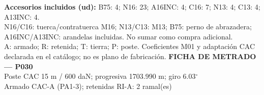 \begingroup\scriptsize
\textbf{Accesorios incluidos (ud):} B75: 4; N16: 23; A16INC: 4; C16: 7; N13: 4; C13: 4; A13INC: 4.\\
N16/C16: tuerca/contratuerca M16; N13/C13: M13; B75: perno de abrazadera; A16INC/A13INC: arandelas incluidas. No sumar como compra adicional.\\
A: armado; R: retenida; T: tierra; P: poste. Coeficientes M01 y adaptación CAC declarada en el catálogo; no es plano de fabricación.
\endgroup\endgroup
\clearpage{}
\begingroup\small\setlength{\parskip}{3pt}\renewcommand{\arraystretch}{1.05}
\textbf{\large FICHA DE METRADO — P030}\\[4pt]
Poste CAC 15 m / 600 daN; progresiva 1703.990 m; giro 6.03\ensuremath{^\circ}\\
Armado CAC-A (PA1-3); retenidas RI-A: 2 ramal(es)\\
\begingroup\scriptsize

